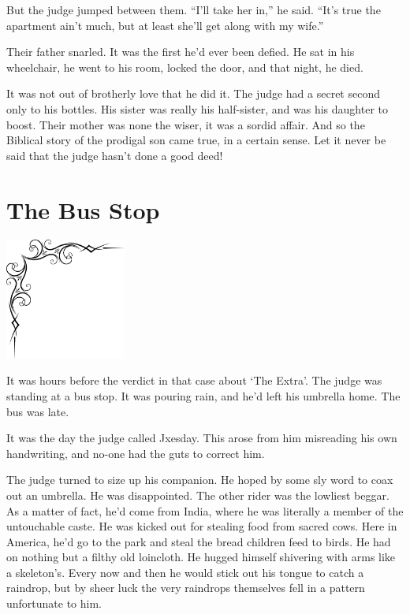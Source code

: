 \documentclass[oneside]{book}
\begin{document}
But the judge jumped between them.
``I'll take her in,'' he said.  ``It's true the apartment
ain't much, but at least she'll get along with my wife.''

Their father snarled.  It was the first he'd ever been
defied.  He sat in his wheelchair, he went to his room, locked
the door, and that night, he died.

It was not out of brotherly love that he did it.
The judge had a secret second only to his bottles.
His sister was really his half-sister, and was his
daughter to boost.  Their mother was none the wiser,
it was a sordid affair.  And so the Biblical story
of the prodigal son came true, in a certain sense.
Let it never be said that the judge hasn't done a good deed!

\chapter{The Bus Stop}

\vspace{-2in}
\hspace{-.5in}
\includegraphics[width=150px]{ulcorner1.eps}

It was hours before the verdict in that case about `The Extra'.
The judge was standing at a bus stop.
It was pouring rain, and he'd left his umbrella home.
The bus was late.

It was the day the judge called Jxesday.  This arose from
him misreading his own handwriting, and no-one had the
guts to correct him.

The judge turned to size up his companion.
He hoped by some sly word to coax out an umbrella.
He was disappointed.
The other rider was the lowliest beggar.
As a matter of fact, he'd come from India, where he was literally
a member of the untouchable caste.  He was kicked out for stealing
food from sacred cows.  Here in America, he'd go to the park and
steal the bread children feed to birds.
He had on nothing but a filthy  old loincloth.  He hugged himself
shivering with arms like a skeleton's.
Every now and then he would stick out his tongue to catch a raindrop,
but by sheer luck the very raindrops themselves fell in a pattern
unfortunate to him.
\end{document}
